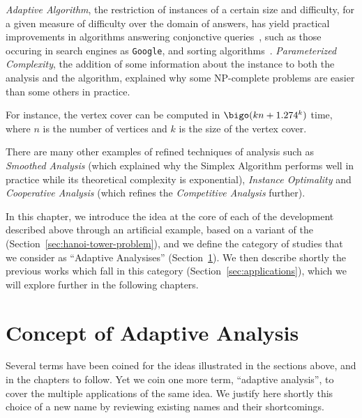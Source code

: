 %
%
\emph{Adaptive Algorithm}, the restriction of instances of a certain
size and difficulty, for a given measure of difficulty over the domain
of answers, has yield practical improvements in algorithms answering
conjonctive queries~\cite{dlm,dlmAlenex}, such as those occuring in
search engines as \texttt{Google}, and sorting
algorithms~\cite{estivillcastro92survey}.
%
%
\emph{Parameterized Complexity}, the addition of some information
about the instance to both the analysis and the algorithm, explained
why some NP-complete problems are easier than some others in
practice. 
%
\begin{EXAMPLE}
  For instance, the vertex cover can be computed in $\bigo(kn +
  1.274^k)$ time, where $n$ is the number of vertices and $k$ is the
  size of the vertex cover.
\end{EXAMPLE}
%
%
\begin{LONG}
  There are many other examples of refined techniques of analysis such
  as \emph{Smoothed Analysis} (which explained why the Simplex
  Algorithm performs well in practice while its theoretical complexity
  is exponential), \emph{Instance Optimality} and \emph{Cooperative
    Analysis} (which refines the \emph{Competitive Analysis} further).
\end{LONG}
%


In this chapter, we introduce the idea at the core of each of the
development described above through an artificial example, based on a
variant of the {\hanoitpb} (Section~\ref{sec:hanoi-tower-problem}),
and we define the category of studies that we consider as ``Adaptive
Analysises'' (Section~\ref{sec:conc-adapt-analys}).
%
We then describe shortly the previous works which fall in this
category (Section~\ref{sec:applications}), which we will explore
further in the following chapters.



\section{Concept of Adaptive Analysis}
\label{sec:conc-adapt-analys}

Several terms have been coined for the ideas illustrated in the
sections above, and in the chapters to follow.
%
Yet we coin one more term, ``adaptive analysis'', to cover the
multiple applications of the same idea.
%
We justify here shortly this choice of a new name by reviewing
existing names and their shortcomings.

